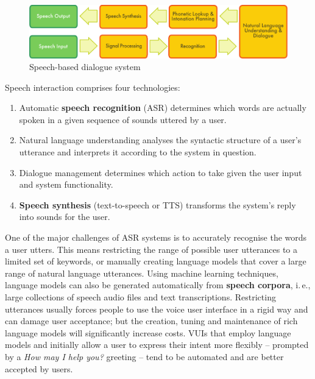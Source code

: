 \begin{multicols}{2}
\begin{figure}[htb]
  \center
  \includegraphics[width=\textwidth]{../_media/english/simple_speech-based_dialogue_architecture}
  \caption{Speech-based dialogue system}
\label{fig:dialoguearch_en}
\end{figure}

Speech interaction comprises four technologies:

\begin{enumerate}
\item Automatic \textbf{speech recognition} (ASR) determines which words are actually spoken in a given sequence of sounds uttered by a user.  
\item Natural language understanding analyses the syntactic structure of a user’s utterance and interprets it according to the system in question.
\item Dialogue management determines which action to take given the user input and system functionality.   
\item \textbf{Speech synthesis} (text-to-speech or TTS) transforms the system’s reply into sounds for the user.
\end{enumerate}

One of the major challenges of ASR systems is to accurately recognise the words a user utters. This means restricting the range of possible user utterances to a limited set of keywords, or manually creating language models that cover a large range of natural language utterances. Using machine learning techniques, language models can also be generated automatically from \textbf{speech corpora}, i.\,e., large collections of speech audio files and text transcriptions. Restricting utterances usually forces people to use the voice user interface in a rigid way and can damage user acceptance; but the creation, tuning and maintenance of rich language models will significantly increase costs. VUIs that employ language models and initially allow a user to express their intent more flexibly -- prompted by a \textit{How may I help you?} greeting -- tend to be automated and are better accepted by users. 


\end{multicols}
